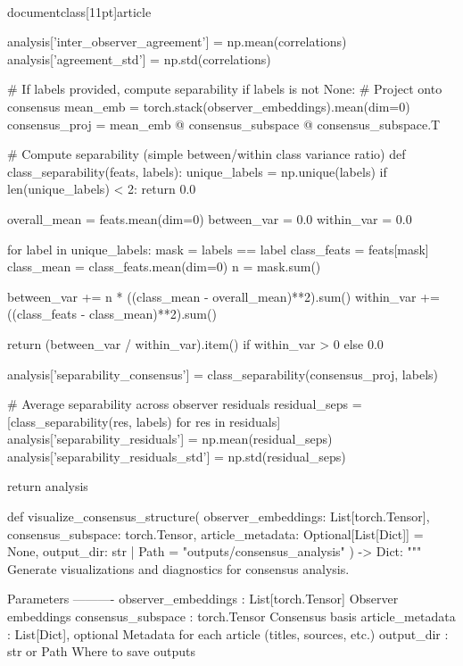 \\documentclass[11pt]{article}
\begin{document}
\begin{CodeBlock}
    analysis['inter_observer_agreement'] = np.mean(correlations)
    analysis['agreement_std'] = np.std(correlations)
    
    # If labels provided, compute separability
    if labels is not None:
        # Project onto consensus
        mean_emb = torch.stack(observer_embeddings).mean(dim=0)
        consensus_proj = mean_emb @ consensus_subspace @ consensus_subspace.T
        
        # Compute separability (simple between/within class variance ratio)
        def class_separability(feats, labels):
            unique_labels = np.unique(labels)
            if len(unique_labels) < 2:
                return 0.0
            
            overall_mean = feats.mean(dim=0)
            between_var = 0.0
            within_var = 0.0
            
            for label in unique_labels:
                mask = labels == label
                class_feats = feats[mask]
                class_mean = class_feats.mean(dim=0)
                n = mask.sum()
                
                between_var += n * ((class_mean - overall_mean)**2).sum()
                within_var += ((class_feats - class_mean)**2).sum()
            
            return (between_var / within_var).item() if within_var > 0 else 0.0
        
        analysis['separability_consensus'] = class_separability(consensus_proj, labels)
        
        # Average separability across observer residuals
        residual_seps = [class_separability(res, labels) for res in residuals]
        analysis['separability_residuals'] = np.mean(residual_seps)
        analysis['separability_residuals_std'] = np.std(residual_seps)
    
    return analysis


def visualize_consensus_structure(
    observer_embeddings: List[torch.Tensor],
    consensus_subspace: torch.Tensor,
    article_metadata: Optional[List[Dict]] = None,
    output_dir: str | Path = "outputs/consensus_analysis"
) -> Dict:
    """
    Generate visualizations and diagnostics for consensus analysis.
    
    Parameters
    ----------
    observer_embeddings : List[torch.Tensor]
        Observer embeddings
    consensus_subspace : torch.Tensor
        Consensus basis
    article_metadata : List[Dict], optional
        Metadata for each article (titles, sources, etc.)
    output_dir : str or Path
        Where to save outputs
    

\end{CodeBlock}
\end{document}
